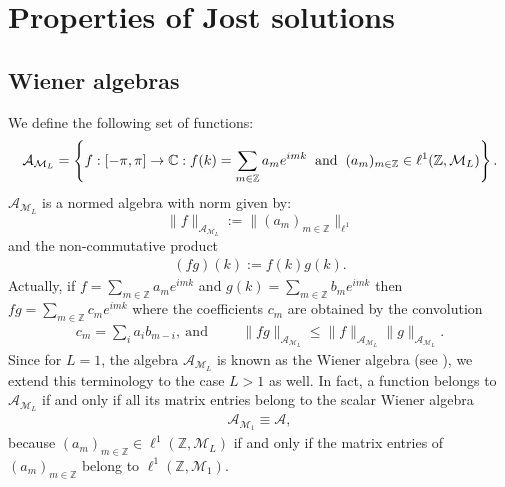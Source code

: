 \documentclass[12pt,oneside,onecolumn,open]{article}
\begin{document}
 \section{Properties of Jost solutions}\label{PJS}
 
 
 \subsection{Wiener algebras}



We define the following set of functions: 
 \begin{equation}
 \label{eq:WM}
     \mathcal{A}_{\mathcal{M}_{L}}=\left\{ f: [-\pi, \pi ]\to \mathbb{C}: f(k)=\sum_{m\in\mathbb{Z}}a_me^{imk} \hspace{0.2cm} \text{and} \hspace{0.2cm} (a_m)_{m\in\mathbb{Z}}\in \ell^1(\mathbb{Z},\mathcal{M}_L)\right\} .
 \end{equation}
 $\mathcal{A}_{\mathcal{M}_{L}}$ is a normed algebra with norm given by:  
\begin{equation}\label{winernorm}
    \|f\|_{ \mathcal{A}_{\mathcal{M}_{L}}}:=\|(a_m)_{m\in  \mathbb{Z}}\|_{\ell ^{1}}
\end{equation}
and the non-commutative product 
\begin{align}
    (f g)(k) := f(k) g(k).  
\end{align}
Actually, if $ f = \sum_{m\in\mathbb{Z}}a_me^{imk} $ and $g(k)  =\sum_{m\in\mathbb{Z}}b_me^{imk} $
 then $ f g = \sum_{m\in\mathbb{Z}}c_me^{imk} $
 where the coefficients  $ c_m  $ are obtained by the convolution 
 \begin{align}
     c_m = \sum_i a_i b_{m-i},  \:  \text{and} \hspace{1cm}  \| f g \|_{ \mathcal{A}_{\mathcal{M}_{L}}} \leq \| f \|_{ \mathcal{A}_{\mathcal{M}_{L}}}  \| g \|_{ \mathcal{A}_{\mathcal{M}_{L}}}.
 \end{align}
 Since for $L = 1$, the algebra $\mathcal{A}_{\mathcal{M}_{L}}$ is known as the Wiener algebra (see \cite{MR3433284}), we extend this terminology to the case $L > 1$ as well.
In fact, a function belongs to $\mathcal{A}_{\mathcal{M}_{L}}$ if and only if all its matrix entries belong to the scalar Wiener algebra
\begin{align}
  \mathcal{A}_{\mathcal{M}_{1}} \equiv \mathcal{A},
 \end{align}
  because $ (a_m)_{m\in\mathbb{Z}}\in \ell^1(\mathbb{Z},\mathcal{M}_L)$ if and only if the matrix entries of $  (a_m)_{m\in\mathbb{Z}} $ belong to 
  $\ell^1(\mathbb{Z},\mathcal{M}_1) .$
 
\end{document}
